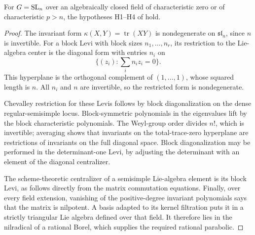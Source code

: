 \begin{lemma}\label{lem:lie-hypotheses}
For $G=\mathrm{SL}_n$ over an algebraically closed field of characteristic zero or of characteristic
$p>n$, the hypotheses H1--H4 of \cite[Theorem~1.1]{CT} hold.
\end{lemma}

\begin{proof}
The invariant form $\kappa(X,Y)=\operatorname{tr}(XY)$ is nondegenerate
on $\mathfrak{sl}_n$, since $n$ is invertible. For a block Levi with
block sizes $n_1,\ldots,n_r$, its restriction to the Lie-algebra center
is the diagonal form with entries $n_i$ on
\[
 \{(z_i):\textstyle\sum_i n_i z_i=0\}.
\]
This hyperplane is the orthogonal complement of $(1,\ldots,1)$,
whose squared length is $n$. All $n_i$ and $n$ are invertible, so the
restricted form is nondegenerate.

Chevalley restriction for these Levis follows by block diagonalization
on the dense regular-semisimple locus. Block-symmetric polynomials in
the eigenvalues lift by the block characteristic polynomials.
The Weyl-group order divides $n!$, which is invertible; averaging shows
that invariants on the total-trace-zero hyperplane are restrictions of
invariants on the full diagonal space. Block diagonalization may be
performed in the determinant-one Levi, by adjusting the determinant
with an element of the diagonal centralizer.

The scheme-theoretic centralizer of a semisimple Lie-algebra element
is its block Levi, as follows directly from the matrix commutation
equations. Finally, over every field extension, vanishing of the
positive-degree invariant polynomials says that the matrix is nilpotent.
A basis adapted to its kernel filtration puts it in a strictly triangular
Lie algebra defined over that field. It therefore lies in the
nilradical of a rational Borel, which supplies the required rational
parabolic.
\end{proof}
